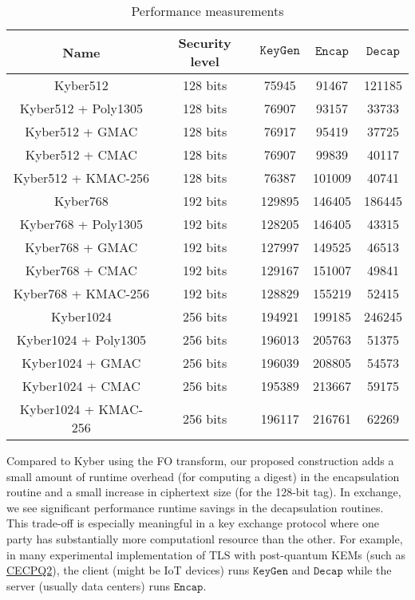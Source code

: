 \documentclass[floatrow,journal=tches,submission]{iacrtrans}
\newcommand{\keygen}{\texttt{KeyGen}}
\newcommand{\encap}{\texttt{Encap}}
\newcommand{\decap}{\texttt{Decap}}
\begin{document}
\begin{table}[H]
    \centering
    \begin{tabular}{|c|c|c|c|c|}
        \hline
        Name & Security level & $\keygen$ & $\encap$ & $\decap$ \\
        \hline
        Kyber512 & 128 bits & 75945 & 91467& 121185 \\
        \hline
        Kyber512 + Poly1305& 128 bits & 76907 & 93157 & 33733 \\
        \hline
        Kyber512 + GMAC& 128 bits & 76917 & 95419 & 37725 \\
        \hline
        Kyber512 + CMAC& 128 bits & 76907 & 99839 & 40117 \\
        \hline
        Kyber512 + KMAC-256& 128 bits & 76387 & 101009 & 40741 \\
        \hline
        Kyber768 & 192 bits & 129895 & 146405& 186445 \\
        \hline
        Kyber768 + Poly1305& 192 bits & 128205 & 146405& 43315 \\
        \hline
        Kyber768 + GMAC& 192 bits & 127997 & 149525 & 46513 \\
        \hline
        Kyber768 + CMAC& 192 bits & 129167 & 151007 & 49841 \\
        \hline
        Kyber768 + KMAC-256& 192 bits & 128829 & 155219 & 52415 \\
        \hline
        Kyber1024 & 256 bits & 194921 & 199185 & 246245 \\
        \hline
        Kyber1024 + Poly1305& 256 bits & 196013 & 205763 & 51375 \\
        \hline
        Kyber1024 + GMAC& 256 bits & 196039 & 208805 & 54573 \\
        \hline
        Kyber1024 + CMAC& 256 bits & 195389 & 213667 & 59175 \\
        \hline
        Kyber1024 + KMAC-256& 256 bits & 196117 & 216761 & 62269 \\
        \hline
    \end{tabular}
    \caption{Performance measurements}\label{tbl:kyber-ae-perf}
\end{table}

Compared to Kyber using the FO transform, our proposed construction adds a small amount of runtime overhead (for computing a digest) in the encapsulation routine and a small increase in ciphertext size (for the 128-bit tag). In exchange, we see significant performance runtime savings in the decapsulation routines. This trade-off is especially meaningful in a key exchange protocol where one party has substantially more computationl resource than the other. For example, in many experimental implementation of TLS with post-quantum KEMs (such as \href{https://blog.cloudflare.com/the-tls-post-quantum-experiment/}{CECPQ2}), the client (might be IoT devices) runs $\keygen$ and $\decap$ while the server (usually data centers) runs $\encap$.
\end{document}
